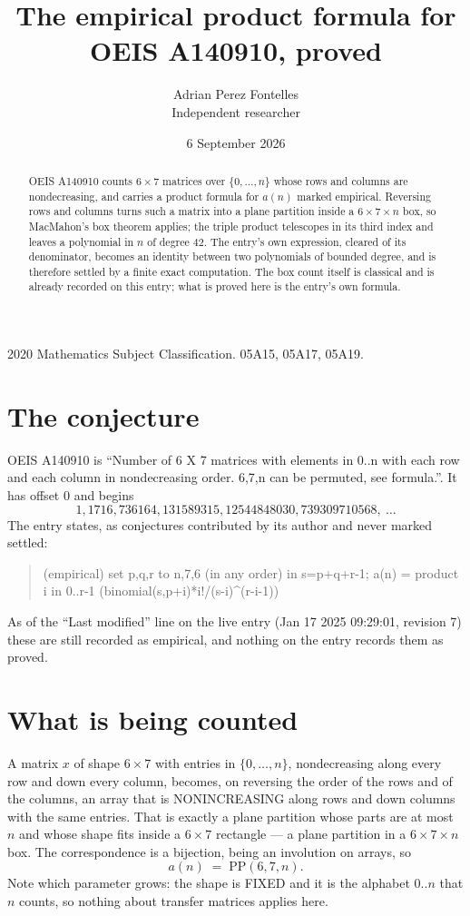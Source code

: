 \documentclass[11pt,a4paper]{article}
\title{The empirical product formula for OEIS A140910, proved}
\author{Adrian Perez Fontelles\\ \small Independent researcher}
\date{6 September 2026}
\theoremstyle{plain}
\theoremstyle{definition}
\begin{document}
\maketitle

\begin{abstract}
OEIS A140910 counts $6\times7$ matrices over $\{0,\dots,n\}$ whose rows and columns are
nondecreasing, and carries a product formula for $a(n)$ marked empirical. Reversing rows and
columns turns such a matrix into a plane partition inside a $6\times7\times n$ box, so
MacMahon's box theorem applies; the triple product telescopes in its third index and leaves a
polynomial in $n$ of degree $42$. The entry's own expression, cleared of its denominator,
becomes an identity between two polynomials of bounded degree, and is therefore settled by a
finite exact computation. The box count itself is classical and is already recorded on this
entry; what is proved here is the entry's own formula.
\end{abstract}

\noindent\small 2020 Mathematics Subject Classification. 05A15, 05A17, 05A19.\normalsize

\section{The conjecture}

OEIS A140910 is ``Number of 6 X 7 matrices with elements in 0..n with each row and each column in nondecreasing order. 6,7,n can be permuted, see formula.''. It has offset $0$ and begins
\[
1, 1716, 736164, 131589315, 12544848030, 739309710568,\ \dots
\]
The entry states, as conjectures contributed by its author and never marked settled:
\begin{quote}
(empirical) set p,q,r to n,7,6 (in any order) in s=p+q+r-1; a(n) = product {i in 0..r-1} (binomial(s,p+i)*i!/(s-i)\^{}(r-i-1))

\end{quote}
As of the ``Last modified'' line on the live entry (Jan 17 2025 09:29:01, revision 7) these are still
recorded as empirical, and nothing on the entry records them as proved.

\section{What is being counted}

A matrix $x$ of shape $6\times7$ with entries in $\{0,\dots,n\}$, nondecreasing along
every row and down every column, becomes, on reversing the order of the rows and of the
columns, an array that is NONINCREASING along rows and down columns with the same entries. That
is exactly a plane partition whose parts are at most $n$ and whose shape fits inside a
$6\times7$ rectangle --- a plane partition in a $6\times7\times n$ box. The
correspondence is a bijection, being an involution on arrays, so
\[
a(n)\;=\;\mathrm{PP}(6,7,n).
\]
Note which parameter grows: the shape is FIXED and it is the alphabet $0..n$ that $n$ counts,
so nothing about transfer matrices applies here.
\end{document}
